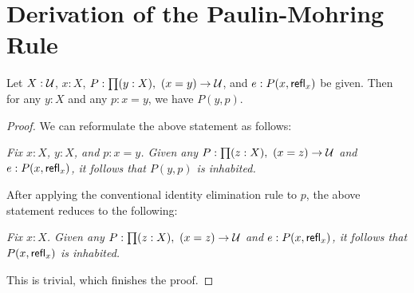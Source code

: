 \section{Derivation of the Paulin-Mohring Rule}
\begin{thm}
Let $X : \mathcal{U}$, $x : X$, $P : \prd{y : X} (x = y) \to \type$, and $e : P(x, \mathsf{refl}_{x})$ be given. Then for any $y : X$ and any $p : x = y$, we have $P(y,p)$.
\end{thm}
\begin{proof}
We can reformulate the above statement as follows: \medskip

\emph{Fix $x : X$, $y : X$, and $p : x = y$. Given any $P : \prd{z : X} (x = z) \to \type$ and $e : P(x, \mathsf{refl}_{x})$, it follows that $P(y,p)$ is inhabited.}
\medskip

After applying the conventional identity elimination rule to $p$, the above statement reduces to the following:

\medskip

\emph{Fix $x : X$. Given any $P : \prd{z : X} (x = z) \to \type$ and $e : P(x, \mathsf{refl}_{x})$, it follows that $P(x,\mathsf{refl}_{x})$ is inhabited.}

\medskip
This is trivial, which finishes the proof.
\end{proof}